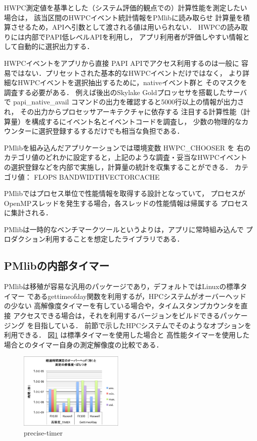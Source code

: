 \documentclass[submit,techrep,noauthor]{ipsj}
\begin{document}
HWPC測定値を基準とした（システム評価的観点での）計算性能を測定したい場合は，
該当区間のHWPCイベント統計情報をPMlibに読み取らせ
計算量を積算させるため，APIへ引数として渡される値は用いられない．
HWPCの読み取りには内部でPAPI低レベルAPIを利用し，
アプリ利用者が評価しやすい情報として自動的に選択出力する．

HWPCイベントをアプリから直接 PAPI APIでアクセス利用するのは一般に
容易ではない．プリセットされた基本的なHWPCイベントだけではなく，
より詳細なHWPCイベントを選択抽出するために，nativeイベント群と
そのマスクを調査する必要がある．
例えば後出のSkylake Goldプロッセサを搭載したサーバで
papi\_native\_avail コマンドの出力を確認すると5000行以上の情報が出力され，
その出力からプロセッサアーキテクチャに依存する
注目する計算性能（計算量）を構成するにイベント名とイベントコードを調査し，
少数の物理的なカウンターに選択登録するするだけでも相当な負担である．

PMlibを組み込んだアプリケーションでは環境変数 HWPC\_CHOOSER を
右のカテゴリ値のどれかに設定すると，上記のような調査・妥当なHWPCイベント
の選択登録などを内部で実施し，計算量の統計を収集することができる．
カテゴリ値：
FLOPS \textbar BANDWIDTH\textbar VECTOR\textbar CACHE


PMlibではプロセス単位で性能情報を取得する設計となっていて，
プロセスがOpenMPスレッドを発生する場合，各スレッドの性能情報は帰属する
プロセスに集計される．

PMlibは一時的なベンチマークツールというよりは，アプリに常時組み込んで
プロダクション利用することを想定したライブラリである．

\subsection{PMlibの内部タイマー}
PMlibは移殖が容易な汎用のパッケージであり，デフォルトではLinuxの標準タイマー
であるgettimeofday関数を利用するが，HPCシステムがオーバーヘッドの少ない
高解像度タイマーを有している場合や，タイムスタンプカウンタを直接
アクセスできる場合は，それを利用するバージョンをビルドできるパッケージング
を目指している．
前節で示したHPCシステムでそのようなオプションを利用できる．
図\ref{fig:precise-timer} は標準タイマーを使用した場合と
高性能タイマーを使用した場合とのタイマー自身の測定解像度の比較である．

\begin{figure}[bt]
\centering\includegraphics[width=0.45\textwidth]{figs/precise-timer.png}
\caption{precise-timer}
\label{fig:precise-timer}
\end{figure}
\end{document}
